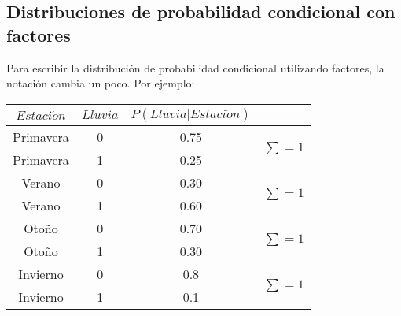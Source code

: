 \subsection{Distribuciones de probabilidad condicional con factores}

Para escribir la distribución de probabilidad condicional utilizando factores, la notación cambia un poco.  Por ejemplo:

\begin{center}
\begin{tabular}{cc|cc}
 $Estaci\acute{o}n$ & $Lluvia$ & $P(Lluvia|Estaci\acute{o}n)$ \\ \toprule
 Primavera & 0 & 0.75 & \multirow{2}{*}{$\sum=1$} \\
 Primavera & 1 & 0.25 \\ \arrayrulecolor{gray}\cline{1-3}
 Verano & 0 & 0.30 & \multirow{2}{*}{$\sum=1$} \\
 Verano & 1 & 0.60 \\ \arrayrulecolor{gray}\cline{1-3}
 Otoño & 0 & 0.70 & \multirow{2}{*}{$\sum=1$} \\
 Otoño & 1 & 0.30 \\ \arrayrulecolor{gray}\cline{1-3}
 Invierno & 0 & 0.8 & \multirow{2}{*}{$\sum=1$} \\
 Invierno & 1 & 0.1 \\
\end{tabular}
\end{center}
